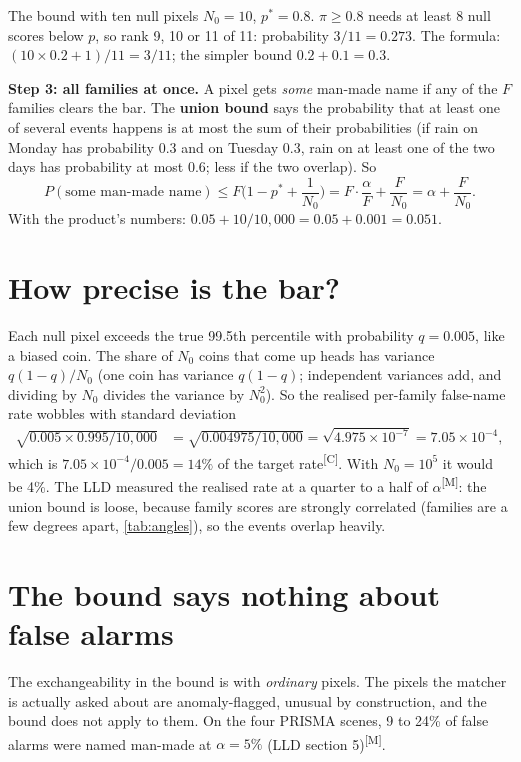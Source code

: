 \documentclass[11pt,a4paper,oneside,openany]{book}
\newcommand{\meas}{\textsuperscript{\textsf{\scriptsize[M]}}}
\newcommand{\comp}{\textsuperscript{\textsf{\scriptsize[C]}}}
\begin{document}
\begin{worked}[label=we:rank]{The bound with ten null pixels}
$N_0=10$, $p^\ast=0.8$. $\pi\ge0.8$ needs at least 8 null scores below $p$, so rank 9, 10 or 11 of 11: probability $3/11=0.273$. The formula:
$(10\times0.2+1)/11=3/11$; the simpler bound $0.2+0.1=0.3$.
\end{worked}

\textbf{Step 3: all families at once.} A pixel gets \emph{some} man-made name if any of the $F$ families clears the bar. The \textbf{union bound} says the probability
that at least one of several events happens is at most the sum of their probabilities (if rain on Monday has probability 0.3 and on Tuesday 0.3, rain on at least one
of the two days has probability at most 0.6; less if the two overlap). So
\[
  P(\text{some man-made name})\le F\Big(1-p^\ast+\frac1{N_0}\Big)=F\cdot\frac{\alpha}{F}+\frac F{N_0}=\alpha+\frac F{N_0}.
\]
With the product's numbers: $0.05+10/10{,}000=0.05+0.001=0.051$.

\section{How precise is the bar?}

Each null pixel exceeds the true 99.5th percentile with probability $q=0.005$, like a biased coin. The share of $N_0$ coins that come up heads has variance
$q(1-q)/N_0$ (one coin has variance $q(1-q)$; independent variances add, and dividing by $N_0$ divides the variance by $N_0^2$). So the realised per-family false-name rate
wobbles with standard deviation
\begin{align*}
\sqrt{0.005\times0.995/10{,}000} &= \sqrt{0.004975/10{,}000}=\sqrt{4.975\times10^{-7}}=7.05\times10^{-4},
\end{align*}
which is $7.05\times10^{-4}/0.005=14\%$ of the target rate\comp. With $N_0=10^5$ it would be 4\%. The LLD measured the realised rate at a quarter to a half of $\alpha$\meas: the
union bound is loose, because family scores are strongly correlated (families are a few degrees apart, \cref{tab:angles}), so the events overlap heavily.

\section{The bound says nothing about false alarms}

The exchangeability in the bound is with \emph{ordinary} pixels. The pixels the matcher is actually asked about are anomaly-flagged, unusual by construction, and the bound
does not apply to them. On the four PRISMA scenes, 9 to 24\% of false alarms were named man-made at $\alpha=5\%$ (LLD section 5)\meas.
\end{document}
